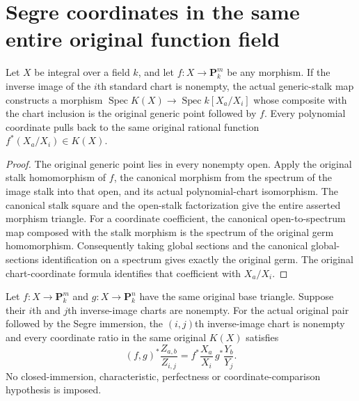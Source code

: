 \section{Segre coordinates in the same entire original function field}
\label{sec:projective-segre-native-coordinates}
\begin{lemma}
\label{lem:segre-native-generic-chart-coefficients}
\leanok
{}
Let $X$ be integral over a field $k$, and let $f:X\to\mathbf P^m_k$ be any
morphism. If the inverse image of the $i$th standard chart is nonempty,
the actual generic-stalk map constructs a morphism
$\operatorname{Spec}K(X)\to\operatorname{Spec}k[X_a/X_i]$ whose composite
with the chart inclusion is the original generic point followed by $f$.
Every polynomial coordinate pulls back to the same original rational
function $f^*(X_a/X_i)\in K(X)$.
\end{lemma}
\begin{proof}
The original generic point lies in every nonempty open. Apply the original
stalk homomorphism of $f$, the canonical morphism from the spectrum of the
image stalk into that open, and its actual polynomial-chart isomorphism.
The canonical stalk square and the open-stalk factorization give the
entire asserted morphism triangle. For a coordinate coefficient, the
canonical open-to-spectrum map composed with the stalk morphism is the
spectrum of the original germ homomorphism. Consequently taking global
sections and the canonical global-sections identification on a spectrum
gives exactly the original germ. The original chart-coordinate formula
identifies that coefficient with $X_a/X_i$.
\end{proof}
\begin{theorem}
\label{thm:segre-native-coordinate-product}
\leanok
{}
Let $f:X\to\mathbf P^m_k$ and $g:X\to\mathbf P^n_k$ have the same original
base triangle. Suppose their $i$th and $j$th inverse-image charts are
nonempty. For the actual original pair followed by the Segre immersion,
the $(i,j)$th inverse-image chart is nonempty and every coordinate ratio
in the same original $K(X)$ satisfies
\[
 (f,g)^*\frac{Z_{a,b}}{Z_{i,j}}
 = f^*\frac{X_a}{X_i}\,g^*\frac{Y_b}{Y_j}.
\]
No closed-immersion, characteristic, perfectness or coordinate-comparison
hypothesis is imposed.
\end{theorem}
